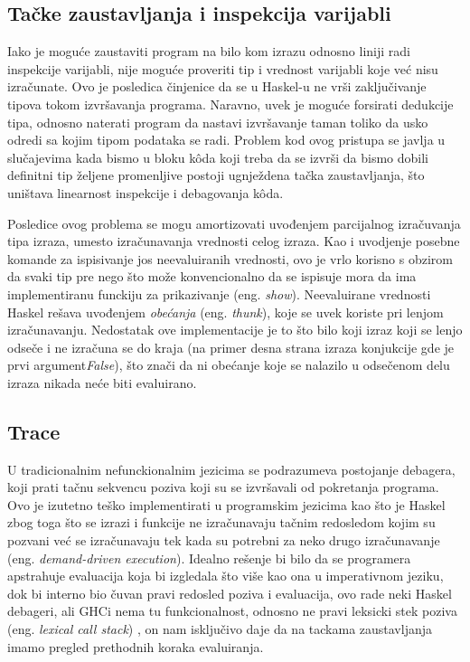 \documentclass[a4paper]{article}
\begin{document}
{{\subsection{Tačke zaustavljanja i inspekcija varijabli}
Iako je moguće zaustaviti program na bilo kom izrazu odnosno liniji radi inspekcije varijabli, nije moguće proveriti tip i vrednost varijabli koje već nisu izračunate. Ovo je posledica činjenice da se u Haskel-u ne vrši zaključivanje tipova tokom izvršavanja programa. Naravno, uvek je moguće forsirati dedukcije tipa, odnosno naterati program da nastavi izvršavanje taman toliko da usko odredi sa kojim tipom podataka se radi. Problem kod ovog pristupa se javlja u slučajevima kada bismo u bloku k\^{o}da koji treba da se izvrši da bismo dobili definitni tip željene promenljive postoji ugnježdena tačka zaustavljanja, što uništava linearnost inspekcije i debagovanja k\^{o}da. 

Posledice ovog problema se mogu amortizovati uvođenjem parcijalnog izračuvanja tipa izraza, umesto izračunavanja vrednosti celog izraza. Kao i uvodjenje posebne komande za ispisivanje jos neevaluiranih vrednosti, ovo je vrlo korisno s obzirom da svaki tip pre nego što može konvencionalno da se ispisuje mora da ima implementiranu funckiju za prikazivanje (eng. {\em show}). Neevaluirane vrednosti Haskel rešava uvođenjem {\em obećanja} (eng. {\em thunk}), koje se uvek koriste pri lenjom izračunavanju. Nedostatak ove implementacije je to što bilo koji izraz koji se lenjo odseče i ne izračuna se do kraja (na primer desna strana izraza konjukcije gde je prvi argument{\em False}), što znači da ni obećanje koje se nalazilo u odsečenom delu izraza nikada neće biti evaluirano.\cite{lipovaca2011learn} 


\subsection{Trace}

U tradicionalnim nefunckionalnim jezicima se podrazumeva postojanje debagera, koji prati tačnu sekvencu poziva koji su se izvršavali od pokretanja programa. Ovo je izutetno teško implementirati u programskim jezicima kao što je Haskel zbog toga što se izrazi i funkcije ne izračunavaju tačnim redosledom kojim su pozvani već se izračunavaju tek kada su potrebni za neko drugo izračunavanje (eng. {\em demand-driven execution}). Idealno rešenje bi bilo da se programera apstrahuje evaluacija koja bi izgledala što više kao ona u imperativnom jeziku, dok bi interno bio čuvan pravi redosled poziva i evaluacija, ovo rade neki Haskel debageri, ali GHCi nema tu funkcionalnost, odnosno ne pravi leksicki stek poziva (eng. {\em lexical call stack}) , on nam isključivo daje da na tackama zaustavljanja imamo pregled prethodnih koraka evaluiranja.


}}
\end{document}
